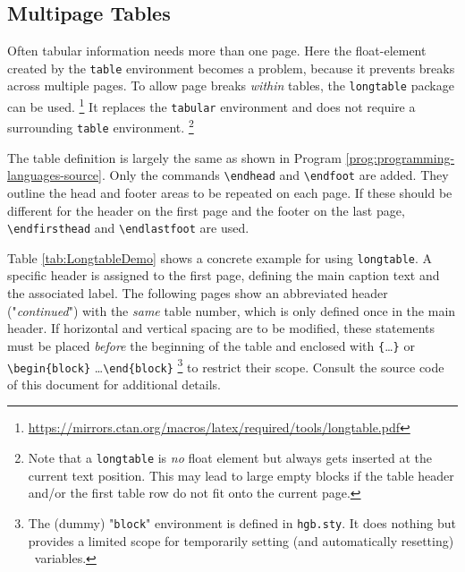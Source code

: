 \subsection{Multipage Tables}

Often tabular information needs more than one page. Here the float-element
created by the \texttt{table} environment becomes a problem, because it
prevents breaks across multiple pages. To allow page breaks \emph{within}
tables, the \texttt{longtable} package can be used.%
\footnote{%
\url{https://mirrors.ctan.org/macros/latex/required/tools/longtable.pdf}}
It replaces the \texttt{tabular} environment and does not require a
surrounding \texttt{table} environment.%
\footnote{Note that a \texttt{longtable} is \emph{no} float element but 
always gets inserted at the current text position. This may lead to large
empty blocks if the table header and/or the first table row do not fit onto
the current page.}

The table definition is largely the same as shown in Program
\ref{prog:programming-languages-source}. Only the commands \verb|\endhead|
and \verb|\endfoot| are added. They outline the head and footer areas to be
repeated on each page. If these should be different for the header on the
first page and the footer on the last page, \verb|\endfirsthead| and
\verb|\endlastfoot| are used.

Table \ref{tab:LongtableDemo} shows a concrete example for using 
\texttt{longtable}. A specific header is assigned to the first page, 
defining the main caption text and the associated label.
The following pages show an abbreviated header ("\emph{continued}") with the
\emph{same} table number, which is only defined once in the main header. 
If horizontal and vertical spacing are to be modified, these statements must
be placed \emph{before} the beginning of the table and enclosed with
\verb|{|\ldots\verb|}| or \verb|\begin{block}| \ldots \verb|\end{block}|%
\footnote{The (dummy) "\texttt{block}" environment is defined in 
\texttt{hgb.sty}. It does nothing but provides a limited scope for
temporarily setting (and automatically resetting) \latex\ variables.}
to restrict their scope. Consult the source code of this document for
additional details.

